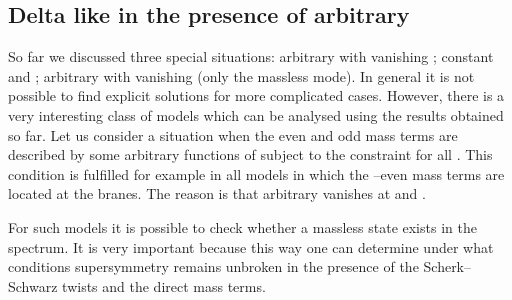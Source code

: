 \documentclass[a4paper,12pt]{article}
\def\ZZ{\mathbb Z}
\begin{document}
\subsection{Delta like \coordHE{} in the presence of arbitrary
\coordHE{}} 


So far we discussed three special situations: arbitrary \coordHE{} with
vanishing \coordHE{}; constant \coordHE{} and \coordHE{}; arbitrary \coordHE{} with 
vanishing \coordHE{} (only the massless mode). In general it is not
possible to find explicit solutions for more complicated cases. 
However, there is a very interesting class of models which can be
analysed using the results obtained so far. Let us consider a
situation when the \myHighlight{$\ZZ_2$}\coordHE{} even and odd mass terms are described by
some arbitrary functions of \coordHE{} subject to the constraint
\coordHE{} for all \coordHE{}. This condition is fulfilled for example 
in all models in which the \myHighlight{$\ZZ_2$}\coordHE{}--even mass terms are located at the
branes. The reason is that arbitrary \coordHE{} vanishes at \coordHE{} and
\coordHE{}. 


For such models it is possible to check whether a massless state
exists in the spectrum. It is very important because this way one can
determine under what conditions supersymmetry remains unbroken in the
presence of the Scherk--Schwarz twists and the direct mass terms.
\end{document}
